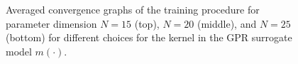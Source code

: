 \begin{figure}
    \centering
    \begin{subfigure}[b]{\textwidth}
        \vspace{-5pt}
    \end{subfigure}
    \begin{subfigure}[b]{\textwidth}
        \vspace{-5pt}
    \end{subfigure}
    \begin{subfigure}[b]{\textwidth}
        \vspace{-5pt}
    \end{subfigure}
    \caption{Averaged convergence graphs of the training procedure for parameter dimension $N=15$ (top), $N=20$ (middle), and $N=25$ (bottom) for different choices for the kernel in the GPR surrogate model $m(\cdot)$.}\label{fig:surrogate_convergence_kernels15-20-25}
\end{figure}